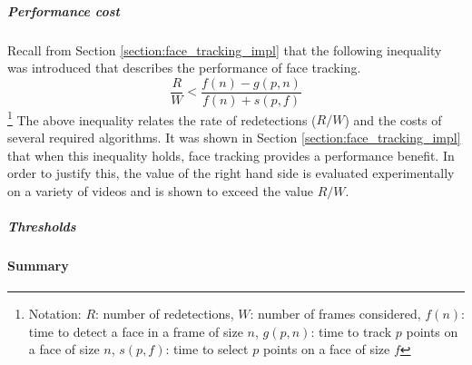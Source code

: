 \subparagraph{Performance cost}
Recall from Section \ref{section:face_tracking_impl} that the following inequality was introduced that describes the performance of face tracking.
\begin{equation*}
    \frac{R}{W} < \frac{f(n)-g(p,n)}{f(n)+s(p,f)}
\end{equation*}\footnote{Notation: $R$: number of redetections, $W$: number of frames considered, $f(n)$: time to detect a face in a frame of size $n$, $g(p,n)$: time to track $p$ points on a face of size $n$, $s(p,f)$: time to select $p$ points on a face of size $f$ }
The above inequality relates the rate of redetections ($R/W$) and the costs of several required algorithms. It was shown in Section \ref{section:face_tracking_impl} that when this inequality holds, face tracking provides a performance benefit.
In order to justify this, the value of the right hand side is evaluated experimentally on a variety of videos and is shown to exceed the value $R/W$.

\subparagraph{Thresholds}


\paragraph{Summary}


